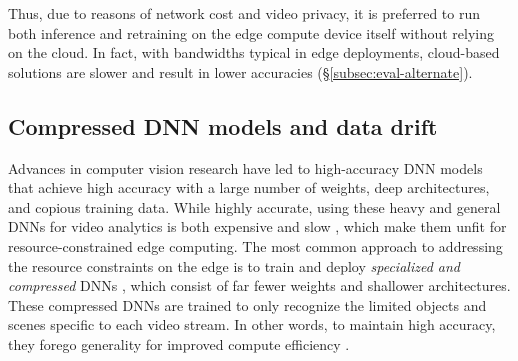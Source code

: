 Thus, due to reasons of network cost and video privacy, it is preferred to run both inference and retraining on the edge compute device itself without relying on the cloud. In fact, with bandwidths typical in edge deployments, cloud-based solutions are slower and result in lower accuracies (\S\ref{subsec:eval-alternate}).

\subsection{Compressed DNN models and data drift}
\label{subsec:continuous}

Advances in computer vision research have led to high-accuracy DNN models that %
achieve high accuracy with a large number of weights, deep architectures, and copious training data. While highly accurate, using these heavy and general DNNs for video analytics is both expensive and slow \cite{noscope, DBLP:conf/osdi/HsiehABVBPGM18}, which make them unfit for resource-constrained edge computing. The most common approach to addressing the resource constraints on the edge is to train and deploy \emph{specialized and compressed} DNNs \cite{compression-4, compression-5, compression-6, compression-17, compression-18, compression-19}, which consist of far fewer weights and shallower architectures.  These compressed DNNs are trained to only recognize the limited objects and scenes specific to each video stream. In other words, to maintain high accuracy, they forego generality for improved compute efficiency \cite{noscope, DBLP:conf/osdi/HsiehABVBPGM18, mullapudi2019}. 


